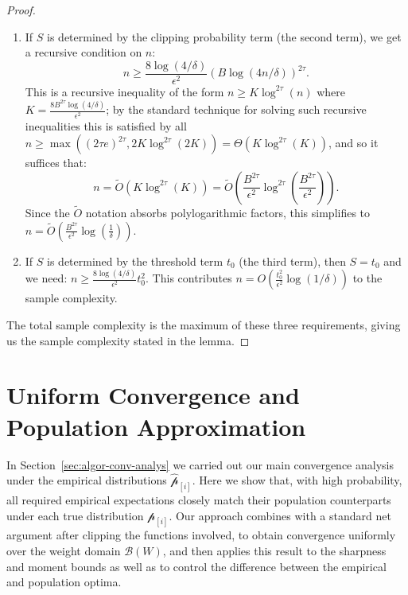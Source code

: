 \documentclass[11pt]{article}
\newcounter{thm}
\numberwithin{thm}{section}
\theoremstyle{plain}
\theoremstyle{definition}
\theoremstyle{remark} \newtheorem{remark}[thm]{Remark}
\def\ep{\widehat{\mathcal{p}}}
\def\pp{{\mathcal{p}}}
\def\cB{{\mathcal{B}}}
\newcommand{\ppi}{{\pp_{[i]}}}
\newcommand{\epi}{\ep_{[i]}}
\begin{document}
\begin{proof}
\begin{enumerate}
\item If $S$ is determined by the clipping probability term (the second term), we get a recursive condition on $n$:
    \[ n \ge \frac{8 \log(4/\delta)}{\epsilon^2} (B \log(4n/\delta))^{2\tau}. \]
    This is a recursive inequality of the form $n \ge K \log^{2\tau}(n)$ where $K = \frac{8 B^{2\tau} \log(4/\delta)}{\epsilon^2}$; by the standard technique for solving such recursive inequalities this is satisfied by all $n \geq \max((2\tau e)^{2\tau}, 2K\log^{2\tau}(2K)) \allowbreak = \Theta(K\log^{2\tau}(K))$, and so it suffices that:
    \[ n = \tilde{O}\left(K \log^{2\tau}(K)\right) = \tilde{O}\left(\frac{B^{2\tau}}{\epsilon^2} \log^{2\tau}\left(\frac{B^{2\tau}}{\epsilon^2}\right)\right). \]
    Since the $\tilde{O}$ notation absorbs polylogarithmic factors, this simplifies to $n = \tilde{O}\left(\frac{B^{2\tau}}{\epsilon^2} \log(\frac 1 \delta)\right)$.
    
    \item If $S$ is determined by the threshold term $t_0$ (the third term), then $S = t_0$ and we need:
    $ n \ge \frac{8 \log(4/\delta)}{\epsilon^2} t_0^2. $
    This contributes $n = O \left(\frac{t_0^2}{\epsilon^2} \log(1/\delta)\right)$ to the sample complexity.
\end{enumerate}
The total sample complexity is the maximum of these three requirements, giving us the sample complexity stated in the lemma. 
\end{proof}

\section{Uniform Convergence and Population Approximation}\label{subsec:uniform-conv}

In Section~\ref{sec:algor-conv-analys} we carried out our main convergence analysis under the empirical distributions $\epi$.  
Here we show that, with high probability, all required empirical expectations closely match their population counterparts under each true distribution $\ppi$.  
Our approach combines 
with a standard net argument after clipping the functions involved, to obtain convergence uniformly over the weight domain $\cB(W)$, 
and then applies this result to the sharpness and moment bounds as well as to control the difference between the empirical and population optima.
\end{document}
